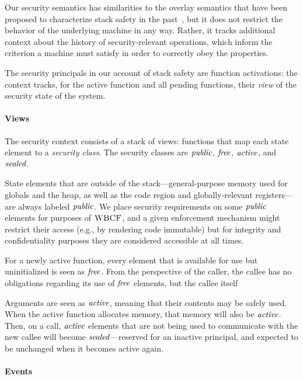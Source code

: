 Our security semantics has similarities to the overlay semantics that have been proposed
to characterize stack safety in the past~\cite{SkorstengaardSTK}, but it does not restrict
the behavior of the underlying machine in any way. Rather, it tracks additional context
about the history of security-relevant operations, which inform the criterion a machine
must satisfy in order to correctly obey the properties.

The security principals in our account of stack safety are function
activations: the context tracks, for the active function and all pending
functions, their {\em view} of the security state of the system.

\paragraph*{Views}

The security context consists of a stack of views: functions that map
each state element to a {\it security class}. The security classes are
\(\mathit{public}\), \(\mathit{free}\), \(\mathit{active}\), and \(\mathit{sealed}\).

State elements that are outside of the stack---general-purpose memory used for
globals and the heap, as well as the code region and globally-relevant
registers---are always labeled \(\mathit{public}\). We place security requirements on some
\(\mathit{public}\) elements for purposes of \(\textnormal{\sc WBCF}\), and a given enforcement mechanism
might restrict their access (e.g., by rendering code immutable) but for integrity
and confidentiality purposes they are considered accessible at all times.

For a newly active function, every element that is available for use but uninitialized
is seen as \(\mathit{free}\). From the perspective of the caller, the callee has no obligations
regarding its use of \(\mathit{free}\) elements, but the callee itself 

Arguments are seen as \(\mathit{active}\), meaning that their contents may be safely used.
When the active function allocates memory, that memory will also be \(\mathit{active}\).
Then, on a call, \(\mathit{active}\) elements that are not being used to communicate with
the new callee will become \(\mathit{sealed}\)---reserved for an inactive principal,
and expected to be unchanged when it becomes active again.

\paragraph*{Events}

